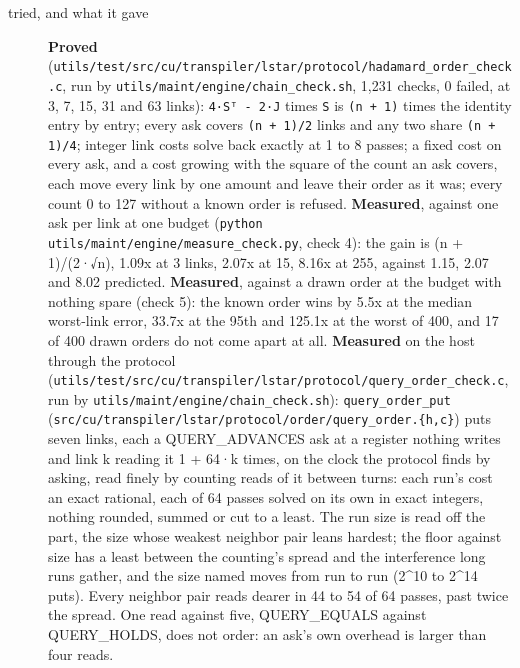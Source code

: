 \begin{description}
\item[{tried, and what it gave}] \textbf{Proved} (\texttt{utils/\allowbreak{}test/\allowbreak{}src/\allowbreak{}cu/\allowbreak{}transpiler/\allowbreak{}lstar/\allowbreak{}protocol/\allowbreak{}hadamard\_\allowbreak{}order\_\allowbreak{}check.\allowbreak{}c}, run by \texttt{utils/\allowbreak{}maint/\allowbreak{}engine/\allowbreak{}chain\_\allowbreak{}check.\allowbreak{}sh}, 1,231 checks, 0 failed, at 3, 7, 15, 31 and 63 links): \texttt{4·Sᵀ -\allowbreak{} 2·J} times \texttt{S} is \texttt{(n + 1)} times the identity entry by entry; every ask covers \texttt{(n + 1)/\allowbreak{}2} links and any two share \texttt{(n + 1)/\allowbreak{}4}; integer link costs solve back exactly at 1 to 8 passes; a fixed cost on every ask, and a cost growing with the square of the count an ask covers, each move every link by one amount and leave their order as it was; every count 0 to 127 without a known order is refused. \textbf{Measured}, against one ask per link at one budget (\texttt{python utils/\allowbreak{}maint/\allowbreak{}engine/\allowbreak{}measure\_\allowbreak{}check.\allowbreak{}py}, check 4): the gain is (n + 1)/(2·√n), 1.09x at 3 links, 2.07x at 15, 8.16x at 255, against 1.15, 2.07 and 8.02 predicted. \textbf{Measured}, against a drawn order at the budget with nothing spare (check 5): the known order wins by 5.5x at the median worst-link error, 33.7x at the 95th and 125.1x at the worst of 400, and 17 of 400 drawn orders do not come apart at all. \textbf{Measured} on the host through the protocol (\texttt{utils/\allowbreak{}test/\allowbreak{}src/\allowbreak{}cu/\allowbreak{}transpiler/\allowbreak{}lstar/\allowbreak{}protocol/\allowbreak{}query\_\allowbreak{}order\_\allowbreak{}check.\allowbreak{}c}, run by \texttt{utils/\allowbreak{}maint/\allowbreak{}engine/\allowbreak{}chain\_\allowbreak{}check.\allowbreak{}sh}): \texttt{query\_\allowbreak{}order\_\allowbreak{}put} (\texttt{src/\allowbreak{}cu/\allowbreak{}transpiler/\allowbreak{}lstar/\allowbreak{}protocol/\allowbreak{}order/\allowbreak{}query\_\allowbreak{}order.\allowbreak{}\{h,c\}}) puts seven links, each a QUERY\_\allowbreak{}ADVANCES ask at a register nothing writes and link k reading it 1 + 64·k times, on the clock the protocol finds by asking, read finely by counting reads of it between turns: each run's cost an exact rational, each of 64 passes solved on its own in exact integers, nothing rounded, summed or cut to a least. The run size is read off the part, the size whose weakest neighbor pair leans hardest; the floor against size has a least between the counting's spread and the interference long runs gather, and the size named moves from run to run (2\textasciicircum{}10 to 2\textasciicircum{}14 puts). Every neighbor pair reads dearer in 44 to 54 of 64 passes, past twice the spread. One read against five, QUERY\_\allowbreak{}EQUALS against QUERY\_\allowbreak{}HOLDS, does not order: an ask's own overhead is larger than four reads.

\end{description}

